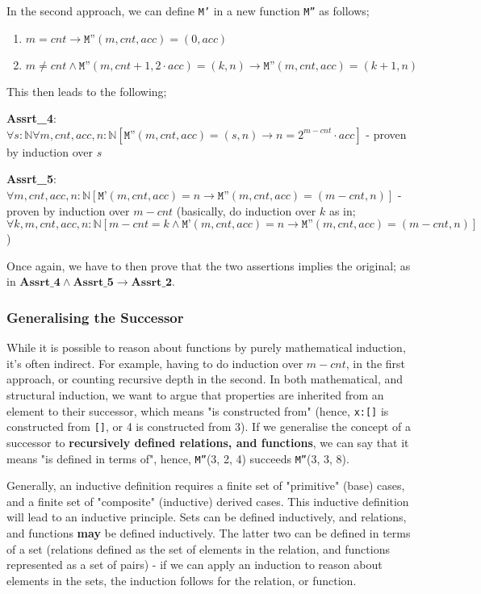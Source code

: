 \documentclass[a4paper, 12pt]{article}
\begin{document}
            In the second approach, we can define \texttt{M'} in a new function \texttt{M''} as follows;
            \begin{enumerate}[M\_1:]
                \itemsep0em
                \setcounter{enumi}{3}
                \item $m = cnt \rightarrow \texttt{M''}(m, cnt, acc) = (0, acc)$
                \item $m \neq cnt \land \texttt{M''}(m, cnt + 1, 2 \cdot acc) = (k, n) \rightarrow \texttt{M''}(m, cnt, acc) = (k + 1, n)$
            \end{enumerate}
            This then leads to the following;
            \smallskip

            \textbf{Assrt\_4}: $\forall s : \mathbb{N} \forall m, cnt, acc, n : \mathbb{N} [\texttt{M''}(m, cnt, acc) = (s, n) \rightarrow n = 2^{m - cnt} \cdot acc]$ - proven by induction over $s$
            \smallskip

            \textbf{Assrt\_5}: $\forall m, cnt, acc, n : \mathbb{N} [\texttt{M'}(m, cnt, acc) = n \rightarrow \texttt{M''}(m, cnt, acc) = (m - cnt, n)]$ - proven by induction over $m - cnt$ (basically, do induction over $k$ as in; $\forall k, m, cnt, acc, n : \mathbb{N} [m - cnt = k \land \texttt{M'}(m, cnt, acc) = n \rightarrow \texttt{M''}(m, cnt, acc) = (m - cnt, n)]$)
            \smallskip

            Once again, we have to then prove that the two assertions implies the original; as in $\textbf{Assrt\_4} \land \textbf{Assrt\_5} \rightarrow \textbf{Assrt\_2}$.
            \subsubsection*{Generalising the Successor}
                While it is possible to reason about functions by purely mathematical induction, it's often indirect. For example, having to do induction over $m - cnt$, in the first approach, or counting recursive depth in the second. In both mathematical, and structural induction, we want to argue that properties are inherited from an element to their successor, which means "is constructed from" (hence, \texttt{x:[]} is constructed from \texttt{[]}, or 4 is constructed from 3). If we generalise the concept of a successor to \textbf{recursively defined relations, and functions}, we can say that it means "is defined in terms of", hence, \texttt{M''}(3, 2, 4) succeeds \texttt{M''}(3, 3, 8).
                \medskip

                Generally, an inductive definition requires a finite set of "primitive" (base) cases, and a finite set of "composite" (inductive) derived cases. This inductive definition will lead to an inductive principle. Sets can be defined inductively, and relations, and functions \textbf{may} be defined inductively. The latter two can be defined in terms of a set (relations defined as the set of elements in the relation, and functions represented as a set of pairs) - if we can apply an induction to reason about elements in the sets, the induction follows for the relation, or function.
\end{document}
